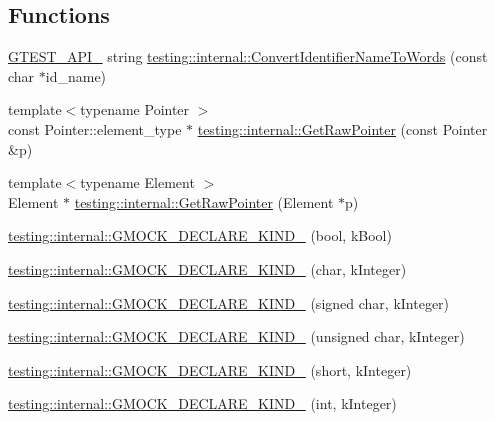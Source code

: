 \subsection*{Functions}
\begin{DoxyCompactItemize}
\item 
\hyperlink{gtest-port_8h_aa73be6f0ba4a7456180a94904ce17790}{G\+T\+E\+S\+T\+\_\+\+A\+P\+I\+\_\+} string \hyperlink{namespacetesting_1_1internal_a571db854f6de337007c53573c9cbf8a3}{testing\+::internal\+::\+Convert\+Identifier\+Name\+To\+Words} (const char $\ast$id\+\_\+name)
\item 
{\footnotesize template$<$typename Pointer $>$ }\\const Pointer\+::element\+\_\+type $\ast$ \hyperlink{namespacetesting_1_1internal_ae88d1a6f95165c43c27a6c0e2d357e61}{testing\+::internal\+::\+Get\+Raw\+Pointer} (const Pointer \&p)
\item 
{\footnotesize template$<$typename Element $>$ }\\Element $\ast$ \hyperlink{namespacetesting_1_1internal_a4d17b114b61b805ac5f37e9c26e29e55}{testing\+::internal\+::\+Get\+Raw\+Pointer} (Element $\ast$p)
\item 
\hyperlink{namespacetesting_1_1internal_a20f5584732e44a368e7acf295b639319}{testing\+::internal\+::\+G\+M\+O\+C\+K\+\_\+\+D\+E\+C\+L\+A\+R\+E\+\_\+\+K\+I\+N\+D\+\_\+} (bool, k\+Bool)
\item 
\hyperlink{namespacetesting_1_1internal_ac8f3722ca21d8b14f86e5c949e843508}{testing\+::internal\+::\+G\+M\+O\+C\+K\+\_\+\+D\+E\+C\+L\+A\+R\+E\+\_\+\+K\+I\+N\+D\+\_\+} (char, k\+Integer)
\item 
\hyperlink{namespacetesting_1_1internal_ae5b8e77d245fd0838ab22e439e92e9af}{testing\+::internal\+::\+G\+M\+O\+C\+K\+\_\+\+D\+E\+C\+L\+A\+R\+E\+\_\+\+K\+I\+N\+D\+\_\+} (signed char, k\+Integer)
\item 
\hyperlink{namespacetesting_1_1internal_ab13e89be2f0f22b1da9e22cd53bce5ce}{testing\+::internal\+::\+G\+M\+O\+C\+K\+\_\+\+D\+E\+C\+L\+A\+R\+E\+\_\+\+K\+I\+N\+D\+\_\+} (unsigned char, k\+Integer)
\item 
\hyperlink{namespacetesting_1_1internal_af191a2be9cff1d5900426ef5aa59851e}{testing\+::internal\+::\+G\+M\+O\+C\+K\+\_\+\+D\+E\+C\+L\+A\+R\+E\+\_\+\+K\+I\+N\+D\+\_\+} (short, k\+Integer)
\item 
\hyperlink{namespacetesting_1_1internal_a59fb8e3bb6f1fec656ed8bdab0048f9f}{testing\+::internal\+::\+G\+M\+O\+C\+K\+\_\+\+D\+E\+C\+L\+A\+R\+E\+\_\+\+K\+I\+N\+D\+\_\+} (int, k\+Integer)
\item 

\end{DoxyCompactItemize}
